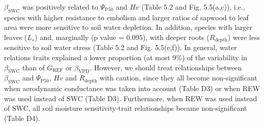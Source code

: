 \documentclass[11pt,twoside]{reedthesis}
\begin{document}
\(\beta_{\text{SWC}}\) was positively related to
\textbar{}\(\Psi_{\text{P50}}\)\textbar{} and \(Hv\) (Table 5.2 and Fig.
5.5(a,c)), i.e., species with higher resistance to embolism and larger
ratios of sapwood to leaf area were more sensitive to soil water
depletion. In addition, species with larger leaves (\(L_s\)) and,
marginally (p value = 0.095), with deeper roots (\(R_{\text{depth}}\))
were less sensitive to soil water stress (Table 5.2 and Fig. 5.5(e,f)).
In general, water relations traits explained a lower proportion (at most
9\%) of the variability in \(\beta_{\text{SWC}}\) than of
\(G_{\text{REF}}\) or \(\beta_{\text{VPD}}\). However, we should treat
relationships between \(\beta_{\text{SWC}}\) and
\textbar{}\(\Psi_{\text{P50}}\)\textbar{}, \(Hv\) and
\(R_{\text{depth}}\) with caution, since they all become non-significant
when aerodynamic conductance was taken into account (Table D3) or when
REW was used instead of SWC (Table D3). Furthermore, when REW was used
instead of SWC, all soil moisture sensitivity-trait relationships became
non-significant (Table D4).\par
\end{document}
